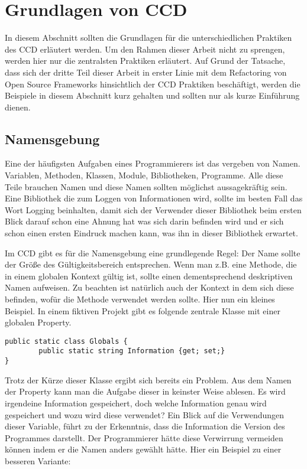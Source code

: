 \chapter{Grundlagen von CCD}
\label{cha:GrundlagenVonCCD}

\SuperPar In diesem Abschnitt sollten die Grundlagen für die unterschiedlichen Praktiken des CCD erläutert werden. Um den Rahmen dieser Arbeit nicht zu sprengen, werden hier nur die zentralsten Praktiken erläutert. Auf Grund der Tatsache, dass sich der dritte Teil dieser Arbeit in erster Linie mit dem Refactoring von Open Source Frameworks hinsichtlich der CCD Praktiken beschäftigt, werden die Beispiele in diesem Abschnitt kurz gehalten und sollten nur als kurze Einführung dienen.

\section{Namensgebung}

Eine der häufigsten Aufgaben eines Programmierers ist das vergeben von Namen. Variablen, Methoden, Klassen, Module, Bibliotheken, Programme. Alle diese Teile brauchen Namen und diese Namen sollten möglichst aussagekräftig sein. Eine Bibliothek die zum Loggen von Informationen wird, sollte im besten Fall das Wort Logging beinhalten, damit sich der Verwender dieser Bibliothek beim ersten Blick darauf schon eine Ahnung hat was sich darin befinden wird und er sich schon einen ersten Eindruck machen kann, was ihn in dieser Bibliothek erwartet.

\SuperPar Im CCD gibt es für die Namensgebung eine grundlegende Regel: Der Name sollte der Größe des Gültigkeitsbereich entsprechen. Wenn man z.B. eine Methode, die in einem globalen Kontext gültig ist, sollte einen dementsprechend deskriptiven Namen aufweisen. Zu beachten ist natürlich auch der Kontext in dem sich diese  befinden, wofür die Methode verwendet werden sollte. Hier nun ein kleines Beispiel. In einem fiktiven Projekt gibt es folgende zentrale Klasse mit einer globalen Property.

\lstset{style=sharpc}
\begin{lstlisting}
public static class Globals {
		public static string Information {get; set;}
}
\end{lstlisting}

Trotz der Kürze dieser Klasse ergibt sich bereits ein Problem. Aus dem Namen der Property kann man die Aufgabe dieser in keinster Weise ablesen. Es wird irgendeine Information gespeichert, doch welche Information genau wird gespeichert und wozu wird diese verwendet? Ein Blick auf die Verwendungen dieser Variable, führt zu der Erkenntnis, dass die Information die Version des Programmes darstellt. Der Programmierer hätte diese Verwirrung vermeiden können indem er die Namen anders gewählt hätte. Hier ein Beispiel zu einer besseren Variante:

